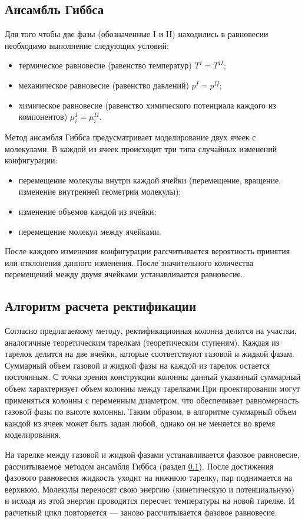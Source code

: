 \subsection{Ансамбль Гиббса} \label{p.gibbs}
Для того чтобы две фазы (обозначенные I и II) находились в равновесии необходимо выполнение следующих условий:
\begin{itemize}
	\item термическое равновесие (равенство температур) $T^I = T^{II}$;
	\item механическое равновесие (равенство давлений) $p^I = p^{II}$;
	\item химическое равновесие (равенство химического потенциала каждого из компонентов) $\mu_i^I = \mu_i^{II}$.
\end{itemize}

Метод ансамбля Гиббса предусматривает моделирование двух ячеек с молекулами. В каждой из ячеек происходит три типа случайных изменений конфигурации:
\begin{itemize}
	\item перемещение молекулы внутри каждой ячейки (перемещение, вращение, изменение внутренней геометрии молекулы);
	\item изменение объемов каждой из ячейки;
	\item перемещение молекул между ячейками.
\end{itemize}
После каждого изменения конфигурации рассчитывается вероятность принятия или отклонения данного изменения. После значительного количества перемещений между двумя ячейками устанавливается равновесие. 


\subsection{Алгоритм расчета ректификации}
Согласно предлагаемому методу, ректификационная колонна делится на участки, аналогичные теоретическим тарелкам (теоретическим ступеням). Каждая из тарелок делится на две ячейки, которые соответствуют газовой и жидкой фазам. Суммарный объем газовой и жидкой фазы на каждой из тарелок остается постоянным. С точки зрения конструкции колонны данный указанный суммарный объем характеризует объем колонны между тарелками.При проектировании могут применяться колонны с переменным диаметром, что обеспечивает равномерность газовой фазы по высоте колонны. Таким образом, в алгоритме суммарный объем каждой из ячеек может быть задан любой, однако он не меняется во время моделирования.

На тарелке между газовой и жидкой фазами устанавливается фазовое равновесие, рассчитываемое методом ансамбля Гиббса (раздел \ref{p.gibbs}). После достижения фазового равновесия жидкость уходит на нижнюю тарелку, пар поднимается на верхнюю. Молекулы переносят свою энергию (кинетическую и потенциальную) и исходя из этой энергии проводится пересчет температуры на новой тарелке. И расчетный цикл повторяется --- заново рассчитывается фазовое равновесие. 


